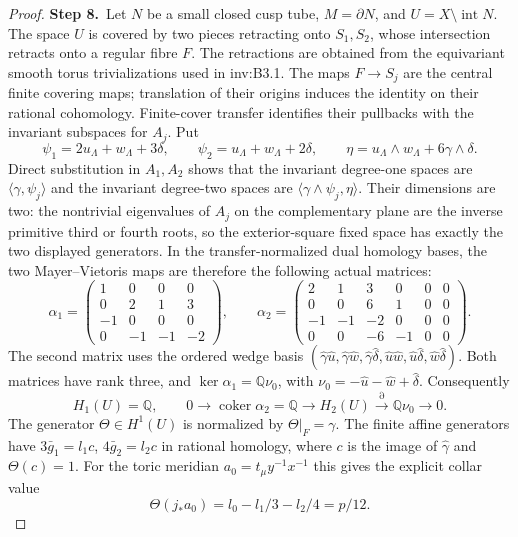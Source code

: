 \begin{proof}
\par\smallskip\noindent\textbf{Step 8.}\ Let $N$ be a small closed cusp tube, $M=\partial N$, and
$U=X\setminus\operatorname{int}N$. The space $U$ is covered by
two pieces retracting onto $S_1,S_2$, whose intersection retracts
onto a regular fibre $F$. The retractions are obtained from the
equivariant smooth torus trivializations used in inv:B3.1. The maps
$F\to S_j$ are the central finite covering maps; translation of
their origins induces the identity on their rational cohomology.
Finite-cover transfer identifies their pullbacks with the invariant
subspaces for $A_j$. Put
\[
 \psi_1=2u_{\Lambda}+w_{\Lambda}+3\delta,\qquad \psi_2=u_{\Lambda}+w_{\Lambda}+2\delta,
 \qquad \eta=u_{\Lambda}\wedge w_{\Lambda}+6\gamma\wedge\delta.
\]
Direct substitution in $A_1,A_2$ shows that the invariant
degree-one spaces are $\langle\gamma,\psi_j\rangle$ and the
invariant degree-two spaces are
$\langle\gamma\wedge\psi_j,\eta\rangle$.
Their dimensions are two: the nontrivial eigenvalues of $A_j$ on
the complementary plane are the inverse primitive third or fourth
roots, so the exterior-square fixed space has exactly the two
displayed generators.
In the transfer-normalized dual homology bases, the two
Mayer--Vietoris maps are therefore the following actual matrices:
\[
 \alpha_1=\begin{pmatrix}
 1&0&0&0\\0&2&1&3\\-1&0&0&0\\0&-1&-1&-2
 \end{pmatrix},\qquad
 \alpha_2=\begin{pmatrix}
 2&1&3&0&0&0\\0&0&6&1&0&0\\
 -1&-1&-2&0&0&0\\0&0&-6&-1&0&0
 \end{pmatrix}.
\]
The second matrix uses the ordered wedge basis
$(\hat\gamma\hat u,\hat\gamma\hat w,\hat\gamma\hat\delta,
\hat u\hat w,\hat u\hat\delta,\hat w\hat\delta)$.
Both matrices have rank three, and
$\ker\alpha_1=\mathbb Q\nu_0$, with
$\nu_0=-\hat u-\hat w+\hat\delta$.
Consequently
\[
 H_1(U)=\mathbb Q,\qquad
 0\longrightarrow\operatorname{coker}\alpha_2=\mathbb Q
 \longrightarrow H_2(U)
 \xrightarrow{\partial}\mathbb Q\nu_0\longrightarrow0.       \tag{B.1}
\]
The generator $\Theta\in H^1(U)$ is normalized by
$\Theta|_F=\gamma$. The finite affine generators have
$3\bar g_1=l_1c$, $4\bar g_2=l_2c$ in rational homology, where
$c$ is the image of $\hat\gamma$ and $\Theta(c)=1$.
For the toric meridian $a_0=t_\mu y^{-1}x^{-1}$ this gives the
explicit collar value
\[
 \Theta(j_*a_0)=l_0-l_1/3-l_2/4=p/12.                 \tag{B.2}
\]


\end{proof}
